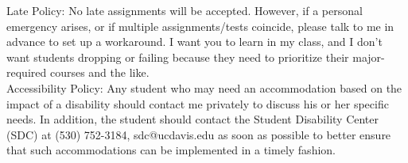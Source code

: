 \documentclass{article}
\begin{document}
\noindent Late Policy: No late assignments will be accepted. However, if a personal emergency arises, or if multiple assignments/tests coincide, please talk to me in advance to set up a workaround. I want you to learn in my class, and I don't want students dropping or failing because they need to prioritize their major-required courses and the like.\\

\noindent Accessibility Policy: Any student who may need an accommodation based on the impact of a disability should contact me privately to discuss his or her specific needs. In addition, the student should contact the Student Disability Center (SDC) at (530) 752-3184, sdc@ucdavis.edu as soon as possible to better ensure that such accommodations can be implemented in a timely fashion.\\
\end{document}
